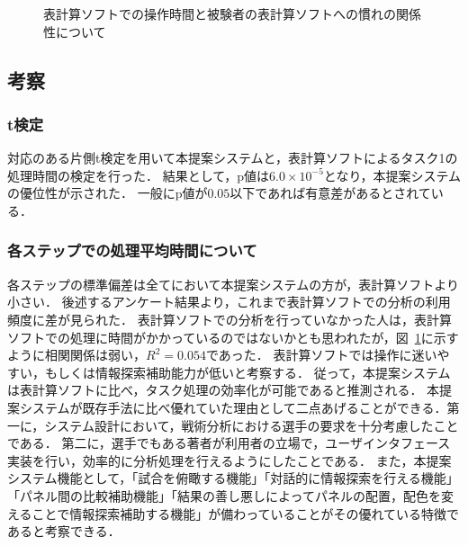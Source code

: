 \documentclass[sotsuron]{kuee}
\begin{document}
			\begin{figure}
				\begin{center}
				\end{center}
				\caption{表計算ソフトでの操作時間と被験者の表計算ソフトへの慣れの関係性について}
		  		\label{fig:result05}
			\end{figure}
		\subsection{考察}
			\subsubsection{t検定}
				対応のある片側t検定を用いて本提案システムと，表計算ソフトによるタスク1の処理時間の検定を行った．
				結果として，p値は$6.0 \times 10^{-5}$となり，本提案システムの優位性が示された．
				一般にp値が$0.05$以下であれば有意差があるとされている．
			\subsubsection{各ステップでの処理平均時間について}
				各ステップの標準偏差は全てにおいて本提案システムの方が，表計算ソフトより小さい．
				後述するアンケート結果より，これまで表計算ソフトでの分析の利用頻度に差が見られた．
				表計算ソフトでの分析を行っていなかった人は，表計算ソフトでの処理に時間がかかっているのではないかとも思われたが，図~\ref{fig:result05}に示すように相関関係は弱い，$R^2 = 0.054$であった．
				表計算ソフトでは操作に迷いやすい，もしくは情報探索補助能力が低いと考察する．
				従って，本提案システムは表計算ソフトに比べ，タスク処理の効率化が可能であると推測される．
				本提案システムが既存手法に比べ優れていた理由として二点あげることができる．第一に，システム設計において，戦術分析における選手の要求を十分考慮したことである．
				第二に，選手でもある著者が利用者の立場で，ユーザインタフェース実装を行い，効率的に分析処理を行えるようにしたことである．
				また，本提案システム機能として，「試合を俯瞰する機能」「対話的に情報探索を行える機能」「パネル間の比較補助機能」「結果の善し悪しによってパネルの配置，配色を変えることで情報探索補助する機能」が備わっていることがその優れている特徴であると考察できる．
\end{document}
